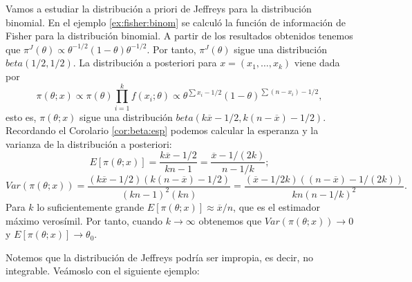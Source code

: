 \documentclass{article}
\begin{document}
\begin{ex}
    Vamos a estudiar la distribución a priori de Jeffreys para la distribución binomial. En el ejemplo \ref{ex:fisher:binom} se calculó la función de información de Fisher para la distribución binomial. A partir de los resultados obtenidos tenemos que $\pi^J(\theta) \propto \theta^{-1/2} (1 - \theta)\theta^{-1/2}$. Por tanto, $\pi^J(\theta)$ sigue una distribución $beta(1/2,1/2)$. La distribución a posteriori para $x = (x_1, \ldots, x_k)$ viene dada por
    \[\pi(\theta; x) \propto \pi(\theta) \prod_{i = 1}^k f(x_i; \theta) \propto \theta^{\sum x_i -1/2} (1 - \theta)^{\sum (n-x_i) -1/2},\]
    esto es, $\pi(\theta;x)$ sigue una distribución $beta(k\overline{x} -1/2, k(n - \overline{x}) - 1/2)$. Recordando el Corolario \ref{cor:beta:esp} podemos calcular la esperanza y la varianza de la distribución a posteriori:
    \[E[\pi(\theta; x)] = \frac{k\overline{x} -1/2}{kn - 1} = \frac{\overline{x} -1/(2k)}{n - 1/k};\]
    \[Var(\pi(\theta; x)) = \frac{(k\overline{x} -1/2)(k(n - \overline{x}) - 1/2)}{(kn - 1)^2(kn)} = \frac{(\overline{x} -1/{2k})((n - \overline{x}) - 1/(2k))}{kn(n - 1/k)^2}.\]
    Para $k$ lo suficientemente grande $E[\pi(\theta; x)] \approx \overline{x} / n$, que es el estimador máximo verosímil. Por tanto, cuando $k \to \infty$ obtenemos que $Var(\pi(\theta; x)) \to 0$ y $E[\pi(\theta; x)] \to \theta_0$.
\end{ex}

Notemos que la distribución de Jeffreys podría ser impropia, es decir, no integrable. Veámoslo con el siguiente ejemplo:
\end{document}
